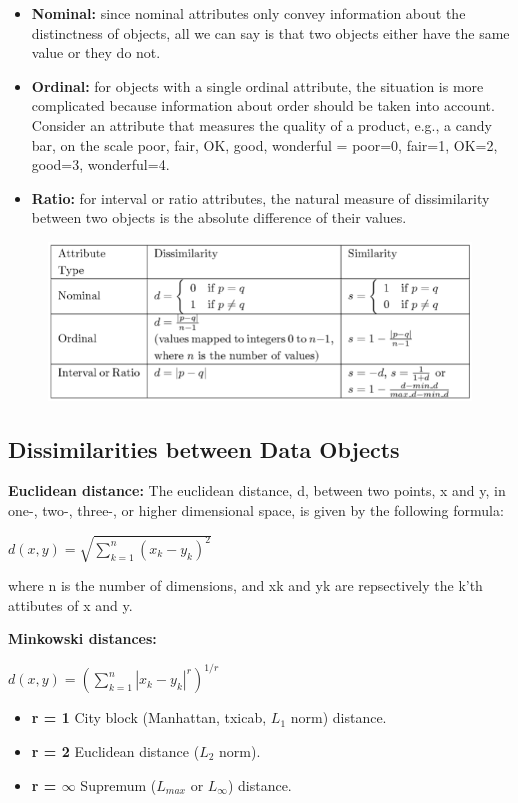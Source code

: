		\begin{itemize}
			\item{\bf Nominal:} since nominal attributes only convey information about
			the distinctness of objects, all we can say is that two objects either have the
			same value or they do not.
			\item{\bf Ordinal:} for objects with a single ordinal attribute, the situation
			is more complicated because information about order should be taken into account.
			Consider an attribute that measures the quality of a product, e.g., a candy bar, 
			on the scale {poor, fair, OK, good, wonderful} = {poor=0, fair=1, OK=2, good=3, 
			wonderful=4}.
			\item{\bf Ratio:} for interval or ratio attributes, the natural measure of dissimilarity
			between two objects is the absolute difference of their values.
		\end{itemize}

		\begin{figure}[H]
			\includegraphics[width=\textwidth]{pics/simpleAttribute.png}
		\end{figure}

	
	\subsection*{Dissimilarities between Data Objects}

	{\bf Euclidean distance:} The euclidean distance, d, between two points, x and y,
	in one-, two-, three-, or higher dimensional space, is given by the following formula:

		$d(x,y) = \sqrt{\sum_{k=1}^{n} (x_k - y_k)^{2}}$
	

	where n is the number of dimensions, and xk and yk are repsectively the k'th attibutes
	of x and y. 

	\clearpage
	{\bf Minkowski distances:}


		$d(x,y) = \left(\sum_{k=1}^{n} |x_k - y_k|^{r}\right) ^{1/r}$

	\begin{itemize}
		\item {\bf r = 1} City block (Manhattan, txicab, $L_{1}$ norm) distance.
		\item {\bf r = 2} Euclidean distance ($L_{2}$ norm).
		\item {\bf r = $\infty$} Supremum ($L_{max}$ or $L_{\infty}$) distance.
	\end{itemize}

